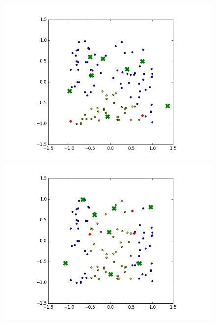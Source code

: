 \documentclass{article}
\theoremstyle{definition}
\begin{document}
\begin{figure}[H]
  \centering
  \begin{minipage}[b]{0.4\textwidth}
    \includegraphics[width=\textwidth]{RBFN-01.png}
    \caption{}
  \end{minipage}
  \hfill
  \centering
  \begin{minipage}[b]{0.4\textwidth}
    \includegraphics[width=\textwidth]{RBFN-02.png}
    \caption{}
  \end{minipage}
  \hfill
  \centering
  \begin{minipage}[b]{0.4\textwidth}

\end{minipage}
\end{figure}
\end{document}
